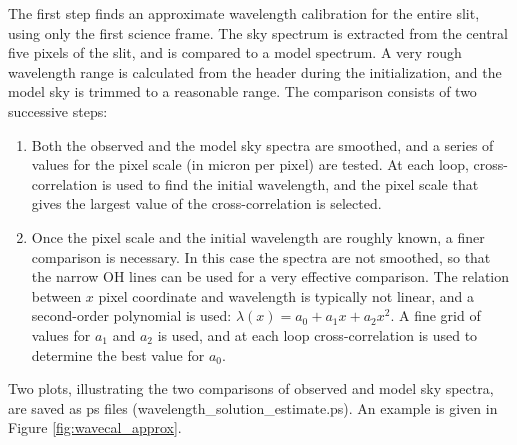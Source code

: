 \documentclass[a4paper, notitlepage]{article}
\begin{document}
The first step finds an approximate wavelength calibration for the entire slit, using only the first science frame. The sky spectrum is extracted from the central five pixels of the slit, and is compared to a model spectrum. A very rough wavelength range is calculated from the header during the initialization, and the model sky is trimmed to a reasonable range. The comparison consists of two successive steps:
\begin{enumerate}
\item Both the observed and the model sky spectra are smoothed, and a series of values for the pixel scale (in micron per pixel) are tested. At each loop, cross-correlation is used to find the initial wavelength, and the pixel scale that gives the largest value of the cross-correlation is selected.
\item Once the pixel scale and the initial wavelength are roughly known, a finer comparison is necessary. In this case the spectra are not smoothed, so that the narrow OH lines can be used for a very effective comparison. The relation between $x$ pixel coordinate and wavelength is typically not linear, and a second-order polynomial is used: $\lambda(x) = a_0 + a_1 x + a_2 x^2$. A fine grid of values for $a_1$ and $a_2$ is used, and at each loop cross-correlation is used to determine the best value for $a_0$.
\end{enumerate}

Two plots, illustrating the two comparisons of observed and model sky spectra, are saved as ps files (wavelength\_solution\_estimate.ps). An example is given in Figure \ref{fig:wavecal_approx}.
\end{document}
